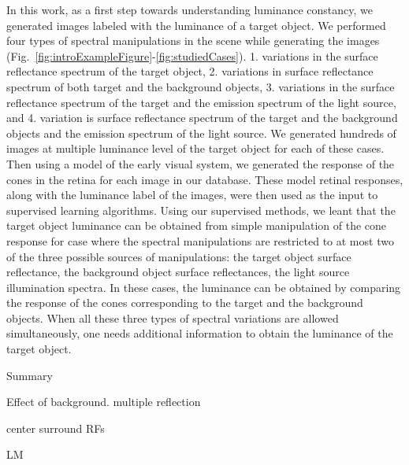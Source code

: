 \documentclass{jov}
\begin{document}
In this work, as a first step towards understanding luminance constancy, we generated images labeled with the luminance of a target object. We performed four types of spectral manipulations in the scene while generating the images (Fig.~\ref{fig:introExampleFigure}-\ref{fig:studiedCases}). 1. variations in the surface reflectance spectrum of the target object, 2. variations in surface reflectance spectrum of both target and the background objects, 3. variations in the surface reflectance spectrum of the target and the emission spectrum of the light source, and 4. variation is surface reflectance spectrum of the target and the background objects and the emission spectrum of the light source. We generated hundreds of images at multiple luminance level of the target object for each of these cases. Then using a model of the early visual system, we generated the response of the cones in the retina for each image in our database. These model retinal responses, along with the luminance label of the images, were then used as the input to supervised learning algorithms. Using our supervised methods, we leant that the target object luminance can be obtained from simple manipulation of the cone response for case where the spectral manipulations are restricted to at most two of the three possible sources of manipulations: the target object surface reflectance, the background object surface reflectances, the light source illumination spectra. In these cases, the luminance can be obtained by comparing the response of the cones corresponding to the target and the background objects. When all these three types of spectral variations are allowed simultaneously, one needs additional information to obtain the luminance of the target object. 


Summary

Effect of background. multiple reflection

center surround RFs

LM



\end{document}
